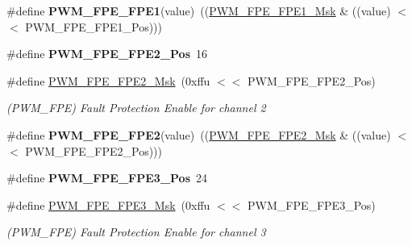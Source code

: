 \begin{DoxyCompactItemize}
\mbox{\label{group__SAMS70__PWM_ga155166e5eb3a0258dbd1afe05a73e4dc}} 
\#define {\bfseries P\+W\+M\+\_\+\+F\+P\+E\+\_\+\+F\+P\+E1}(value)~((\mbox{\hyperlink{group__SAMV71__PWM_ga41c1d32975b17740532d30eb42912879}{P\+W\+M\+\_\+\+F\+P\+E\+\_\+\+F\+P\+E1\+\_\+\+Msk}} \& ((value) $<$$<$ P\+W\+M\+\_\+\+F\+P\+E\+\_\+\+F\+P\+E1\+\_\+\+Pos)))
\item 
\mbox{\label{group__SAMS70__PWM_ga21f498501f20a5815cbe734e7423e6f9}} 
\#define {\bfseries P\+W\+M\+\_\+\+F\+P\+E\+\_\+\+F\+P\+E2\+\_\+\+Pos}~16
\item 
\mbox{\label{group__SAMS70__PWM_ga3dbe9d68d6f74bdebf54e40585180117}} 
\#define \mbox{\hyperlink{group__SAMS70__PWM_ga3dbe9d68d6f74bdebf54e40585180117}{P\+W\+M\+\_\+\+F\+P\+E\+\_\+\+F\+P\+E2\+\_\+\+Msk}}~(0xffu $<$$<$ P\+W\+M\+\_\+\+F\+P\+E\+\_\+\+F\+P\+E2\+\_\+\+Pos)
\begin{DoxyCompactList}\small\item\em (P\+W\+M\+\_\+\+F\+PE) Fault Protection Enable for channel 2 \end{DoxyCompactList}\item 
\mbox{\label{group__SAMS70__PWM_ga3a562170cbf8ff1723eab2792c2f6590}} 
\#define {\bfseries P\+W\+M\+\_\+\+F\+P\+E\+\_\+\+F\+P\+E2}(value)~((\mbox{\hyperlink{group__SAMV71__PWM_ga3dbe9d68d6f74bdebf54e40585180117}{P\+W\+M\+\_\+\+F\+P\+E\+\_\+\+F\+P\+E2\+\_\+\+Msk}} \& ((value) $<$$<$ P\+W\+M\+\_\+\+F\+P\+E\+\_\+\+F\+P\+E2\+\_\+\+Pos)))
\item 
\mbox{\label{group__SAMS70__PWM_gab088806ad2c20b9973854e3b8a0fd33c}} 
\#define {\bfseries P\+W\+M\+\_\+\+F\+P\+E\+\_\+\+F\+P\+E3\+\_\+\+Pos}~24
\item 
\mbox{\label{group__SAMS70__PWM_gaca9a5e5dcb472caf52d3c2c8b0321657}} 
\#define \mbox{\hyperlink{group__SAMS70__PWM_gaca9a5e5dcb472caf52d3c2c8b0321657}{P\+W\+M\+\_\+\+F\+P\+E\+\_\+\+F\+P\+E3\+\_\+\+Msk}}~(0xffu $<$$<$ P\+W\+M\+\_\+\+F\+P\+E\+\_\+\+F\+P\+E3\+\_\+\+Pos)
\begin{DoxyCompactList}\small\item\em (P\+W\+M\+\_\+\+F\+PE) Fault Protection Enable for channel 3 \end{DoxyCompactList}\item 

\end{DoxyCompactItemize}
